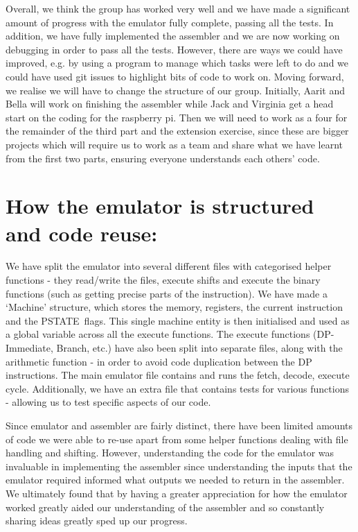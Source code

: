 \documentclass[11pt]{article}
\begin{document}
{}

{Overall, we think the group has worked very well and we have made a
significant amount of progress with the emulator fully complete, passing
all the tests. In addition, we have fully implemented the assembler and
we are now working on debugging in order to pass all the tests. However,
there are ways we could have improved, e.g. by using a program to manage
which tasks were left to do and we could have used git issues to
highlight bits of code to work on. Moving forward, we realise we will
have to change the structure of our group. Initially, Aarit and Bella
will work on finishing the assembler while Jack and Virginia get a head
start on the coding for the raspberry pi. Then we will need to work as a
four for the remainder of the third part and the extension exercise,
since these are bigger projects which will require us to work as a team
and share what we have learnt from the first two parts, ensuring
everyone understands each others' code.}

{}

\hypertarget{h.y7qyz74o89sv}{%
\section{\texorpdfstring{{How the emulator is structured and code
reuse:}}{How the emulator is structured and code reuse:}}\label{h.y7qyz74o89sv}}

{}

{We have split the emulator into several different files with
categorised helper functions - they read/write the files, execute shifts
and execute the binary functions (such as getting precise parts of the
instruction). We have made a `Machine' structure, which stores the
memory, registers, the current instruction and the }{PSTATE}{~flags.
This single machine entity is then initialised and used as a global
variable across all the execute functions. The execute functions
(DP-Immediate, Branch, etc.) have also been split into separate files,
along with the arithmetic function - in order to avoid code duplication
between the DP instructions. The main emulator file contains and runs
the fetch, decode, execute cycle. Additionally, we have an extra file
that contains tests for various functions - allowing us to test specific
aspects of our code.}

{}

{Since emulator and assembler are fairly distinct, there have been
limited amounts of code we were able to re-use apart from some helper
functions dealing with file handling and shifting. However,
understanding the code for the emulator was invaluable in implementing
the assembler since understanding the inputs that the emulator required
informed what outputs we needed to return in the assembler. We
ultimately found that by having a greater appreciation for how the
emulator worked greatly aided our understanding of the assembler and so
constantly sharing ideas greatly sped up our progress.}
\end{document}
